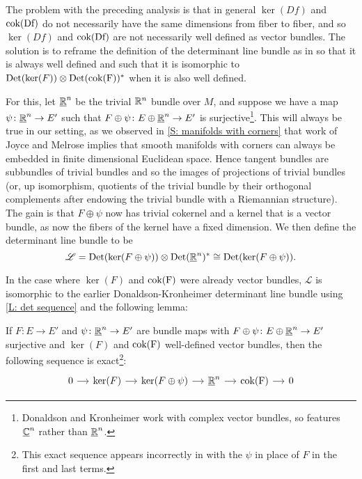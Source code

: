 The problem with the preceding analysis is that in general $\ker(Df)$ and $\rm cok(Df)$ do not necessarily have the same dimensions from fiber to fiber, and so $\ker(Df)$ and $\rm cok(Df)$ are not necessarily well defined as vector bundles.
The solution is to reframe the definition of the determinant line bundle as in \cite{DoKr90} so that it is always well defined and such that it is isomorphic to ${\rm Det}(\ker(F)) \otimes {\rm Det}(\rm cok(F))^*$ when it is also well defined.

For this, let $\underline{\mathbb{R}}^n$ be the trivial $\mathbb{R}^n$ bundle over $M$, and suppose we have a map $\psi \colon \underline{\mathbb{R}}^n \to E'$ such that $F \oplus \psi \colon E \oplus \underline{\mathbb{R}}^n \to E'$ is surjective\footnote{Donaldson and Kronheimer work with complex vector bundles, so \cite{DoKr90} features $\underline{\mathbb{C}}^n$ rather than $\underline{\mathbb{R}}^n$.}.
This will always be true in our setting, as we observed in \cref{S: manifolds with corners} that work of Joyce and Melrose implies that smooth manifolds with corners can always be embedded in finite dimensional Euclidean space.
Hence tangent bundles are subbundles of trivial bundles and so the images of projections of trivial bundles (or, up isomorphism, quotients of the trivial bundle by their orthogonal complements after endowing the trivial bundle with a Riemannian structure).
The gain is that $F \oplus \psi$ now has trivial cokernel and a kernel that is a vector bundle, as now the fibers of the kernel have a fixed dimension.
We then define the determinant line bundle to be
$$\mathscr L = {\rm Det}(\ker(F \oplus \psi)) \otimes {\rm Det}(\underline{\mathbb{R}}^n)^* \cong {\rm Det}(\ker(F \oplus \psi)).$$

In the case where $\ker(F)$ and $\rm cok(F)$ were already vector bundles, $\mathscr L$ is isomorphic to the earlier Donaldson-Kronheimer determinant line bundle using \cref{L: det sequence} and the following lemma:

\begin{lemma}
	If $F \colon E \to E'$ and $\psi \colon \underline{\mathbb{R}}^n \to E'$ are bundle maps with $F \oplus \psi \colon E \oplus \underline{\mathbb{R}}^n \to E'$ surjective and $\ker(F)$ and $\rm cok(F)$ well-defined vector bundles, then the following sequence is exact\footnote{This exact sequence appears incorrectly in \cite{DoKr90} with the $\psi$ in place of $F$ in the first and last terms.}:
	\[
	\begin{tikzcd}[column sep=small]
		0 \arrow[r] & \ker(F) \arrow[r] & \ker(F \oplus \psi) \arrow[r] & \underline{\R}^n \arrow[r] & \cok(F) \arrow[r] & 0
	\end{tikzcd}
	\]
\end{lemma}

